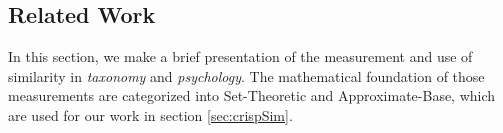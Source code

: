 \subsection{Related Work}
\label{sec:RWSim}
In this section, we make a brief presentation of the measurement and use of similarity in \textit{taxonomy} and \textit{psychology}. The mathematical foundation of those measurements are categorized into Set-Theoretic and Approximate-Base, which are used for our work in section \ref{sec:crispSim}. 

